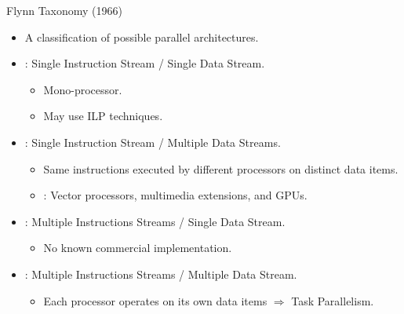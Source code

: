 \begin{frame}[t]{Flynn Taxonomy (1966)}
\begin{itemize}
  \item A classification of possible parallel architectures.

  \item {}: Single Instruction Stream / Single Data Stream.
    \begin{itemize}
      \item Mono-processor.
      \item May use ILP techniques.
    \end{itemize}

  \item {}: Single Instruction Stream / Multiple Data Streams.
    \begin{itemize}
      \item Same instructions executed by different processors on distinct data items.
      \item {}: Vector processors, multimedia extensions, and GPUs.
    \end{itemize}

  \item {}: Multiple Instructions Streams / Single Data Stream.
    \begin{itemize}
      \item No known commercial implementation.
    \end{itemize}

  \item {}: Multiple Instructions Streams / Multiple Data Stream.
    \begin{itemize}
      \item Each processor operates on its own data items $\Rightarrow$ Task Parallelism.
    \end{itemize}

\end{itemize}
\end{frame}

